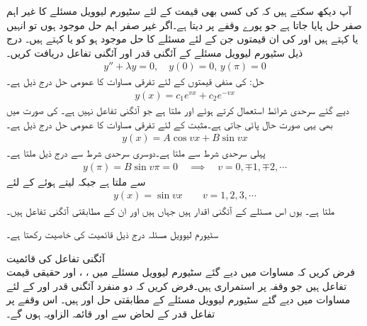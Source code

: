 آپ دیکھ سکتے ہیں کہ  کی کسی بھی قیمت کے لئے سٹیورم لیوویل مسئلے کا غیر اہم صفر حل  پایا جاتا ہے جو پورے وقفے پر  دیتا ہے۔اگر غیر صفر اہم حل   موجود ہوں تو انہیں  یا  کہتے ہیں اور  کی ان قیمتوں جن کے لئے مسئلے کا حل موجود ہو کو  یا  کہتے ہیں۔
درج ذیل سٹیورم لیوویل مسئلے کے آئگنی قدر اور آئگنی تفاعل دریافت کریں۔
\begin{align*}
y''+\lambda y=0,\quad y(0)=0,\, y(\pi)=0
\end{align*}
حل: کی منفی قیمتوں  کے لئے تفرقی مساوات کا عمومی حل درج ذیل ہے۔
\begin{align*}
y(x)=c_1e^{vx}+c_2e^{-vx}
\end{align*}
دیے گئے سرحدی شرائط استعمال کرتے ہوئے  اور  ملتا ہے جو آئگنی تفاعل نہیں ہے۔ کی صورت میں بھی یہی صورت حال پائی جاتی ہے۔مثبت  کے لئے تفرقی مساوات کا عمومی حل درج ذیل ہے۔
\begin{align*}
y(x)=A\cos vx+B\sin vx
\end{align*}
پہلی سرحدی شرط سے   ملتا ہے۔دوسری سرحدی شرط سے درج ذیل ملتا ہے۔
\begin{align*}
y(\pi)=B\sin v \pi=0 \quad \implies \quad v=0, \mp1, \mp2,\cdots
\end{align*}
 سے  ملتا ہے جبکہ  لیتے ہوئے  کے لئے 
\begin{align*}
y(x)=\sin vx\quad \quad v=1,2,3,\cdots
\end{align*}
ملتا ہے۔ یوں اس مسئلے کے آئگنی اقدار  ہیں جہاں  ہیں اور ان کے مطابقتی آئگنی تفاعل  ہیں۔
 

سٹیورم لیوویل مسئلہ  درج ذیل قائمیت کی خاصیت رکھتا ہے۔ 

\quad آئگنی تفاعل کی قائمیت\\
فرض کریں کہ مساوات  میں دیے گئے سٹیورم لیوویل مسئلے  میں  ، ،  اور   حقیقی قیمت تفاعل ہیں جو وقفہ  پر استمراری ہیں۔فرض کریں کہ دو منفرد آئگنی قدر  اور  کے لئے مساوات  میں دیے گئے سٹیورم لیوویل مسئلے  کے مطابقتی حل    اور   ہیں۔ اس وقفے پر تفاعل قدر  کے لحاض سے  اور  قائمہ الزاویہ ہوں گے۔

